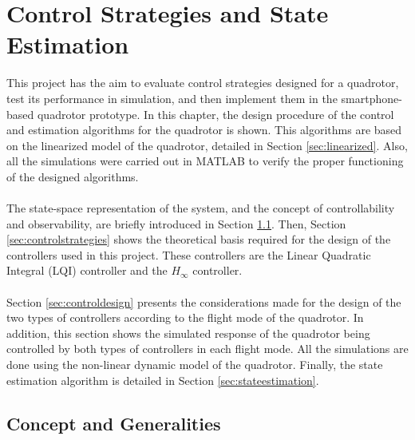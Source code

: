 \chapter{Control Strategies and State Estimation} \label{ch:controlandestimation}
This project has the aim to evaluate control strategies designed for a quadrotor, test its performance in simulation, and then implement them in the smartphone-based quadrotor prototype. In this chapter, the design procedure of the control and estimation algorithms for the quadrotor is shown. This algorithms are based on the linearized model of the quadrotor, detailed in Section \ref{sec:linearized}. Also, all the simulations were carried out in MATLAB to verify the proper functioning of the designed algorithms.
\\\\
The state-space representation of the system, and the concept of controllability and observability, are briefly introduced in Section \ref{sec:generalities}. Then, Section \ref{sec:controlstrategies} shows the theoretical basis required for the design of the controllers used in this project. These controllers are the Linear Quadratic Integral (LQI) controller and the $H_\infty$ controller.
\\\\
Section \ref{sec:controldesign} presents the considerations made for the design of the two types of controllers according to the flight mode of the quadrotor. In addition, this section shows the simulated response of the quadrotor being controlled by both types of controllers in each flight mode. All the simulations are done using the non-linear dynamic model of the quadrotor. Finally, the state estimation algorithm is detailed in Section \ref{sec:stateestimation}.

\section{Concept and Generalities}
\label{sec:generalities}

